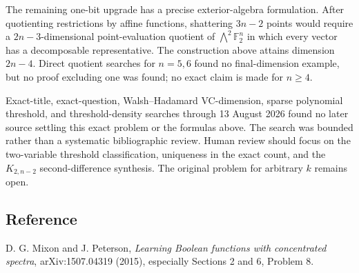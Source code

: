 \documentclass[11pt]{article}
\newcommand{\F}{\mathbb F}
\begin{document}
The remaining one-bit upgrade has a precise exterior-algebra formulation.
After quotienting restrictions by affine functions, shattering \(3n-2\)
points would require a \(2n-3\)-dimensional point-evaluation quotient of
\(\bigwedge^2\F_2^n\) in which every vector has a decomposable representative.
The construction above attains dimension \(2n-4\).  Direct quotient searches
for \(n=5,6\) found no final-dimension example, but no proof excluding one was
found; no exact claim is made for \(n\ge4\).

Exact-title, exact-question, Walsh--Hadamard VC-dimension, sparse polynomial
threshold, and threshold-density searches through 13 August 2026 found no
later source settling this exact problem or the formulas above.  The search
was bounded rather than a systematic bibliographic review.  Human review
should focus on the two-variable threshold classification, uniqueness in the
exact count, and the \(K_{2,n-2}\) second-difference synthesis.  The original
problem for arbitrary \(k\) remains open.

\subsection*{Reference}
\noindent [1] D. G. Mixon and J. Peterson,
\emph{Learning Boolean functions with concentrated spectra},
arXiv:1507.04319 (2015), especially Sections 2 and 6, Problem 8.
\end{document}

